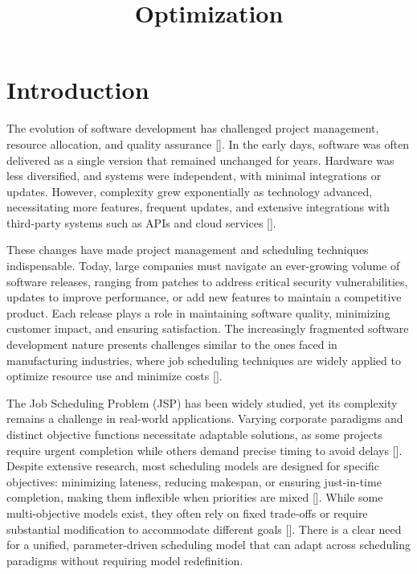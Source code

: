 \documentclass[12pt]{article}
\title{Optimization}
\author{}
\date{}
\begin{document}
\maketitle

\section*{Introduction}

The evolution of software development has challenged project management, resource allocation, and quality assurance []. In the early days, software was often delivered as a single version that remained unchanged for years. Hardware was less diversified, and systems were independent, with minimal integrations or updates. However, complexity grew exponentially as technology advanced, necessitating more features, frequent updates, and extensive integrations with third-party systems such as APIs and cloud services [].

These changes have made project management and scheduling techniques indispensable. Today, large companies must navigate an ever-growing volume of software releases, ranging from patches to address critical security vulnerabilities, updates to improve performance, or add new features to maintain a competitive product. Each release plays a role in maintaining software quality, minimizing customer impact, and ensuring satisfaction. The increasingly fragmented software development nature presents challenges similar to the ones faced in manufacturing industries, where job scheduling techniques are widely applied to optimize resource use and minimize costs []. %

The Job Scheduling Problem (JSP) has been widely studied, yet its complexity remains a challenge in real-world applications. Varying corporate paradigms and distinct objective functions necessitate adaptable solutions, as some projects require urgent completion while others demand precise timing to avoid delays []. Despite extensive research, most scheduling models are designed for specific objectives: minimizing lateness, reducing makespan, or ensuring just-in-time completion, making them inflexible when priorities are mixed []. While some multi-objective models exist, they often rely on fixed trade-offs or require substantial modification to accommodate different goals []. There is a clear need for a unified, parameter-driven scheduling model that can adapt across scheduling paradigms without requiring model redefinition.
\end{document}
